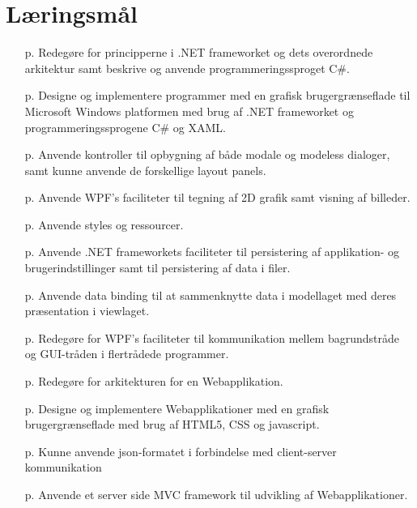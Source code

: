 \section{Læringsmål}

\begin{itemize}
	\item [p.\pageref{sec:spm1}] Redegøre for principperne i .NET frameworket og dets overordnede arkitektur samt beskrive og anvende programmeringssproget C\#.

	\item [p.\pageref{sec:spm2}] Designe og implementere programmer med en grafisk brugergrænseflade til Microsoft Windows platformen med brug af .NET frameworket og programmeringssprogene C\# og XAML.

	\item [p.\pageref{sec:spm3}] Anvende kontroller til opbygning af både modale og modeless dialoger, samt kunne anvende de forskellige layout panels.

	\item [p.\pageref{sec:spm4}] Anvende WPF's faciliteter til tegning af 2D grafik samt visning af billeder.
	
	\item [p.\pageref{sec:spm5}] Anvende styles og ressourcer.
	
	\item [p.\pageref{sec:spm6}] Anvende .NET frameworkets faciliteter til persistering af applikation- og brugerindstillinger samt til persistering af data i filer.
	
	\item [p.\pageref{sec:spm7}] Anvende data binding til at sammenknytte data i modellaget med deres præsentation i viewlaget.
	
	\item [p.\pageref{sec:spm8}] Redegøre for WPF's faciliteter til kommunikation mellem bagrundstråde og GUI-tråden i flertrådede programmer.
	
	\item [p.\pageref{sec:spm9}] Redegøre for arkitekturen for en Webapplikation.
	
	\item [p.\pageref{sec:spm10}] Designe og implementere Webapplikationer med en grafisk brugergrænseflade med brug af HTML5, CSS og javascript.
	
	\item [p.\pageref{sec:spm11}] Kunne anvende json-formatet i forbindelse med client-server kommunikation	
	
	\item [p.\pageref{sec:spm12}] Anvende et server side MVC framework til udvikling af Webapplikationer.
\end{itemize}